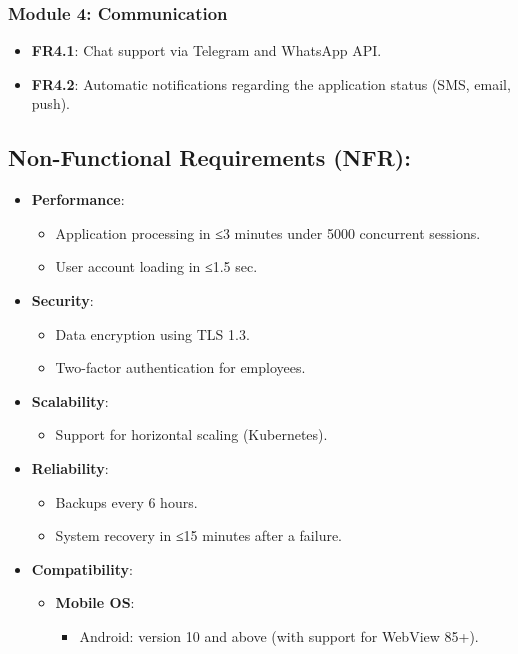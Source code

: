 \documentclass[a4paper,12pt]{article}
\begin{document}
\subsubsection*{Module 4: Communication}
\begin{itemize}
    \item \textbf{FR4.1}: Chat support via Telegram and WhatsApp API.
    \item \textbf{FR4.2}: Automatic notifications regarding the application status (SMS, email, push).
\end{itemize}

\subsection*{Non-Functional Requirements (NFR):}
\begin{itemize}
    \item \textbf{Performance}:
    \begin{itemize}
        \item Application processing in ≤3 minutes under 5000 concurrent sessions.
        \item User account loading in ≤1.5 sec.
    \end{itemize}
    \item \textbf{Security}:
    \begin{itemize}
        \item Data encryption using TLS 1.3.
        \item Two-factor authentication for employees.
    \end{itemize}
    \item \textbf{Scalability}:
    \begin{itemize}
        \item Support for horizontal scaling (Kubernetes).
    \end{itemize}
    \item \textbf{Reliability}:
    \begin{itemize}
        \item Backups every 6 hours.
        \item System recovery in ≤15 minutes after a failure.
    \end{itemize}
    \item \textbf{Compatibility}:
    \begin{itemize}
        \item \textbf{Mobile OS}:
            \begin{itemize}
                \item Android: version 10 and above (with support for WebView 85+).

\end{itemize}
\end{itemize}
\end{itemize}
\end{document}
